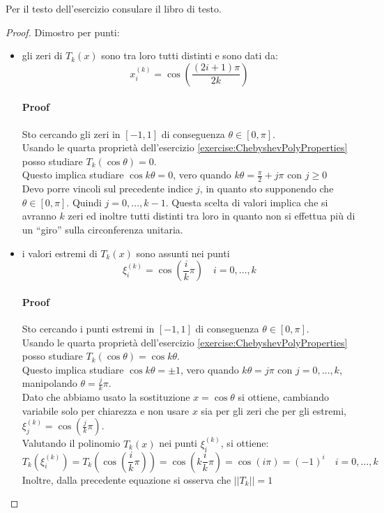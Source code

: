 \begin{exercise}[4.13]
Per il testo dell'esercizio consulare il libro di testo.
\end{exercise}
\begin{proof}
Dimostro per punti:
\begin{itemize}
  \item gli zeri di $T_{k}(x)$ sono tra loro tutti distinti e sono dati da:
  \begin{displaymath}
  x_{i}^{(k)} = \cos\left(\frac{(2i+1)\pi}{2k}\right)
  \end{displaymath}
  \paragraph{Proof} Sto cercando gli zeri in $[-1,1]$ di conseguenza 
  $\theta \in [0, \pi]$. 
  \\Usando le quarta propriet\`a dell'esercizio 
  \ref{exercise:ChebyshevPolyProperties} posso studiare $T_{k}(\cos\theta) = 0$.
  \\ Questo implica studiare $\cos k\theta = 0$, vero quando $k\theta =
  \frac{\pi}{2} + j\pi$ con $j \geq 0$
  \\ Devo porre vincoli sul precedente indice $j$, in quanto sto supponendo che
  $\theta \in [0, \pi]$. Quindi $j = 0,\ldots,k-1$. Questa scelta di valori
  implica che si avranno $k$ zeri ed inoltre tutti distinti tra loro in quanto
  non si effettua pi\`u di un ``giro'' sulla circonferenza unitaria.
  
  \item i valori estremi di $T_{k}(x)$ sono assunti nei punti
  \begin{displaymath}
  \xi_{i}^{(k)} = \cos\left(\frac{i}{k}\pi\right) \quad i = 0,\ldots,k
  \end{displaymath} 
  \paragraph{Proof} Sto cercando i punti estremi in $[-1,1]$ di conseguenza 
  $\theta \in [0, \pi]$. 
  \\Usando le quarta propriet\`a dell'esercizio 
  \ref{exercise:ChebyshevPolyProperties} posso studiare $T_{k}(\cos\theta) =
  \cos k\theta$. 
  \\ Questo implica studiare $\cos k\theta = \pm 1$, vero quando
  $k\theta = j\pi$ con $j = 0, \ldots, k$, manipolando $\theta =
  \frac{j}{k}\pi$.
  \\ Dato che abbiamo usato la sostituzione $x = \cos\theta$ si ottiene,
  cambiando variabile solo per chiarezza e non usare $x$ sia per gli zeri che
  per gli estremi, $\xi_{j}^{(k)} = \cos\left(\frac{j}{k}\pi\right)$.
  \\Valutando il polinomio $T_{k}(x)$ nei punti $\xi_{i}^{(k)}$, si ottiene:
  \begin{displaymath}
  T_{k}(\xi_{i}^{(k)}) = T_{k}\left(\cos\left(\frac{i}{k}\pi\right)\right) =
   \cos\left(k \frac{i}{k}\pi\right) = \cos\left(i\pi\right) = (-1)^{i} \quad i
   = 0,\ldots,k
  \end{displaymath} 
  Inoltre, dalla precedente equazione si osserva che $||T_{k}|| = 1$
  

\end{itemize}
\end{proof}
